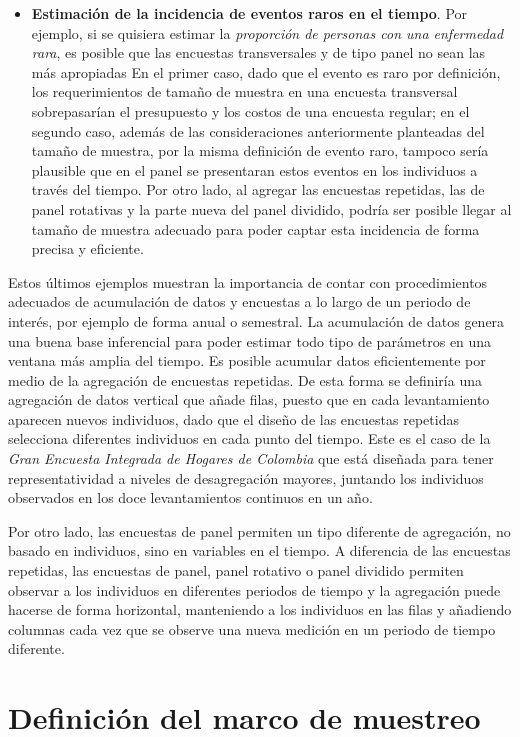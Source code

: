 \documentclass[
  12pt,
]{book}
\begin{document}
\begin{itemize}
\item
  \textbf{Estimación de la incidencia de eventos raros en el tiempo}. Por ejemplo, si se quisiera estimar la \emph{proporción de personas con una enfermedad rara}, es posible que las encuestas transversales y de tipo panel no sean las más apropiadas En el primer caso, dado que el evento es raro por definición, los requerimientos de tamaño de muestra en una encuesta transversal sobrepasarían el presupuesto y los costos de una encuesta regular; en el segundo caso, además de las consideraciones anteriormente planteadas del tamaño de muestra, por la misma definición de evento raro, tampoco sería plausible que en el panel se presentaran estos eventos en los individuos a través del tiempo. Por otro lado, al agregar las encuestas repetidas, las de panel rotativas y la parte nueva del panel dividido, podría ser posible llegar al tamaño de muestra adecuado para poder captar esta incidencia de forma precisa y eficiente.
\end{itemize}

Estos últimos ejemplos muestran la importancia de contar con procedimientos adecuados de acumulación de datos y encuestas a lo largo de un periodo de interés, por ejemplo de forma anual o semestral. La acumulación de datos genera una buena base inferencial para poder estimar todo tipo de parámetros en una ventana más amplia del tiempo. Es posible acumular datos eficientemente por medio de la agregación de encuestas repetidas. De esta forma se definiría una agregación de datos vertical que añade filas, puesto que en cada levantamiento aparecen nuevos individuos, dado que el diseño de las encuestas repetidas selecciona diferentes individuos en cada punto del tiempo. Este es el caso de la \emph{Gran Encuesta Integrada de Hogares de Colombia} que está diseñada para tener representatividad a niveles de desagregación mayores, juntando los individuos observados en los doce levantamientos continuos en un año.

Por otro lado, las encuestas de panel permiten un tipo diferente de agregación, no basado en individuos, sino en variables en el tiempo. A diferencia de las encuestas repetidas, las encuestas de panel, panel rotativo o panel dividido permiten observar a los individuos en diferentes periodos de tiempo y la agregación puede hacerse de forma horizontal, manteniendo a los individuos en las filas y añadiendo columnas cada vez que se observe una nueva medición en un periodo de tiempo diferente.

\hypertarget{definiciuxf3n-del-marco-de-muestreo}{%
\chapter{Definición del marco de muestreo}\label{definiciuxf3n-del-marco-de-muestreo}}
\end{document}

